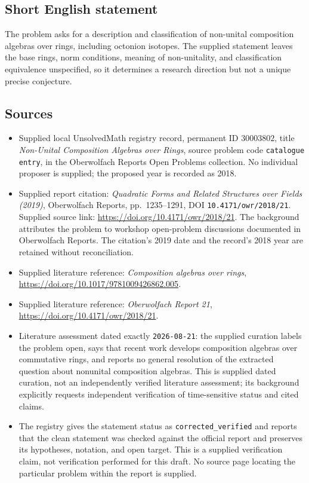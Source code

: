 \documentclass[11pt]{article}
\begin{document}
\subsection{Short English statement}
The problem asks for a description and classification of non-unital composition algebras over rings, including octonion isotopes. The supplied statement leaves the base rings, norm conditions, meaning of non-unitality, and classification equivalence unspecified, so it determines a research direction but not a unique precise conjecture.
\subsection{Sources}
\begin{itemize}
\item Supplied local UnsolvedMath registry record, permanent ID \(30003802\), title \emph{Non-Unital Composition Algebras over Rings}, source problem code \texttt{catalogue entry}, in the Oberwolfach Reports Open Problems collection. No individual proposer is supplied; the proposed year is recorded as 2018.
\item Supplied report citation: \emph{Quadratic Forms and Related Structures over Fields (2019)}, Oberwolfach Reports, pp.~1235--1291, DOI \texttt{10.4171/owr/2018/21}. Supplied source link: \url{https://doi.org/10.4171/owr/2018/21}. The background attributes the problem to workshop open-problem discussions documented in Oberwolfach Reports. The citation's 2019 date and the record's 2018 year are retained without reconciliation.
\item Supplied literature reference: \emph{Composition algebras over rings}, \url{https://doi.org/10.1017/9781009426862.005}.
\item Supplied literature reference: \emph{Oberwolfach Report 21}, \url{https://doi.org/10.4171/owr/2018/21}.
\item Literature assessment dated exactly \texttt{2026-08-21}: the supplied curation labels the problem open, says that recent work develops composition algebras over commutative rings, and reports no general resolution of the extracted question about nonunital composition algebras. This is supplied dated curation, not an independently verified literature assessment; its background explicitly requests independent verification of time-sensitive status and cited claims.
\item The registry gives the statement status as \texttt{corrected\_verified} and reports that the clean statement was checked against the official report and preserves its hypotheses, notation, and open target. This is a supplied verification claim, not verification performed for this draft. No source page locating the particular problem within the report is supplied.
\end{itemize}
\end{document}
